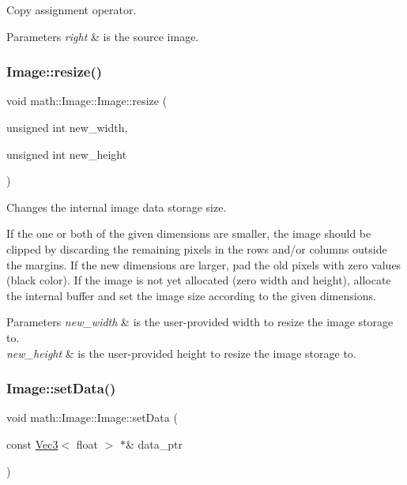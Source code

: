 Copy assignment operator.


\begin{DoxyParams}{Parameters}
{\em right} & is the source image. \\
\hline
\end{DoxyParams}
\mbox{\label{classmath_1_1_image_a3dc725fbfeac02c4687bb7c7e4a184fd}} 
\subsubsection{\texorpdfstring{Image\+::resize()}{Image::resize()}}
{\footnotesize\ttfamily void math\+::\+Image\+::\+Image\+::resize (\begin{DoxyParamCaption}\item[{unsigned int}]{new\+\_\+width,  }\item[{unsigned int}]{new\+\_\+height }\end{DoxyParamCaption})}

Changes the internal image data storage size.

If the one or both of the given dimensions are smaller, the image should be clipped by discarding the remaining pixels in the rows and/or columns outside the margins. If the new dimensions are larger, pad the old pixels with zero values (black color). If the image is not yet allocated (zero width and height), allocate the internal buffer and set the image size according to the given dimensions.


\begin{DoxyParams}{Parameters}
{\em new\+\_\+width} & is the user-\/provided width to resize the image storage to. \\
\hline
{\em new\+\_\+height} & is the user-\/provided height to resize the image storage to. \\
\hline
\end{DoxyParams}
\mbox{\label{classmath_1_1_image_a6078dd91d77a6753e774466e61afd6f6}} 
\subsubsection{\texorpdfstring{Image\+::set\+Data()}{Image::setData()}}
{\footnotesize\ttfamily void math\+::\+Image\+::\+Image\+::set\+Data (\begin{DoxyParamCaption}\item[{const \hyperlink{classmath_1_1_vec3}{Vec3}$<$ float $>$ $\ast$\&}]{data\+\_\+ptr }\end{DoxyParamCaption})}

